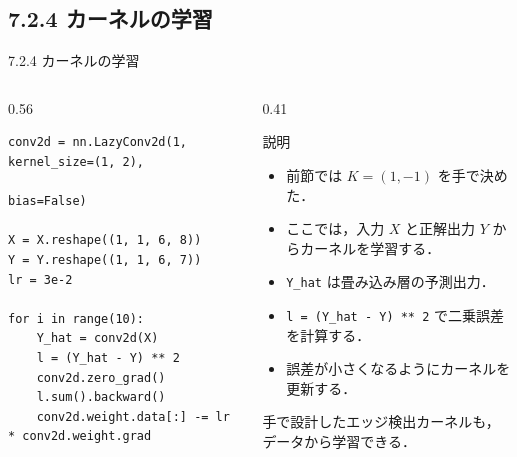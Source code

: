 \documentclass[dvipdfmx,uplatex,unicode,9pt,aspectratio=169]{beamer}
\begin{document}
\subsection{7.2.4 カーネルの学習}
\begin{frame}[fragile]{7.2.4 カーネルの学習}
\begin{columns}[T,onlytextwidth]
\begin{column}{0.56\textwidth}
\begin{lstlisting}
conv2d = nn.LazyConv2d(1, kernel_size=(1, 2),
                       bias=False)

X = X.reshape((1, 1, 6, 8))
Y = Y.reshape((1, 1, 6, 7))
lr = 3e-2

for i in range(10):
    Y_hat = conv2d(X)
    l = (Y_hat - Y) ** 2
    conv2d.zero_grad()
    l.sum().backward()
    conv2d.weight.data[:] -= lr * conv2d.weight.grad
\end{lstlisting}
\end{column}

\begin{column}{0.41\textwidth}
\begin{block}{説明}
\begin{itemize}
\item 前節では $K=(1,-1)$ を手で決めた．
\item ここでは，入力 $X$ と正解出力 $Y$ からカーネルを学習する．
\item \texttt{Y\_hat} は畳み込み層の予測出力．
\item \texttt{l = (Y\_hat - Y) ** 2} で二乗誤差を計算する．
\item 誤差が小さくなるようにカーネルを更新する．
\end{itemize}
\end{block}

\begin{seminaralertbox}
手で設計したエッジ検出カーネルも，
データから学習できる．
\end{seminaralertbox}
\end{column}
\end{columns}
\end{frame}
\end{document}
